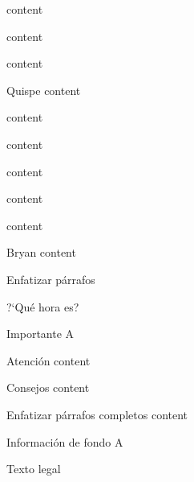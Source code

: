 \begin{conjecture}
	content
\end{conjecture}

\begin{corollary}
	content
\end{corollary}

\begin{definition}
	content
\end{definition}

\begin{example}{Quispe}
	content
\end{example}



\begin{lemma}
	content
\end{lemma}

\begin{note}
	content
\end{note}

\begin{problem}
	content
\end{problem}

\begin{property}
	content
\end{property}

\begin{proposition}
	content
\end{proposition}

\begin{question}{Bryan}
	content
\end{question}

\begin{remark}

\end{remark}

\begin{theorem}

\end{theorem}

\begin{trailer}{Enfatizar párrafos}
\end{trailer}

\begin{question}{?`Qué hora es?}
\end{question}

\begin{important}{Importante}
	A
\end{important}

\begin{warning}{Atención}
	content
\end{warning}

\begin{tips}{Consejos}
	content
\end{tips}

\begin{overview}{Enfatizar párrafos completos}
	content
\end{overview}

\begin{backgroundinformation}{Información de fondo}
	A
\end{backgroundinformation}

\begin{legaltext}{Texto legal}
	
\end{legaltext}